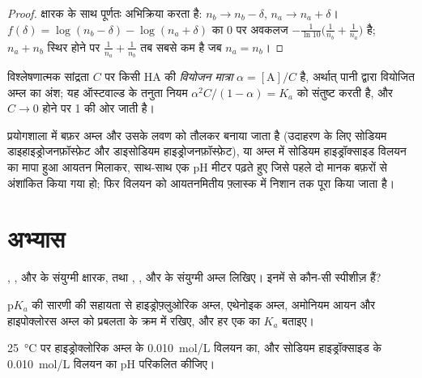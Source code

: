 \begin{proof}
 क्षारक के साथ पूर्णतः अभिक्रिया करता है: $n_b \to n_b - \delta$,
$n_a \to n_a + \delta$। $f(\delta) = \log(n_b - \delta) -
\log(n_a + \delta)$ का 0 पर अवकलज $-\frac{1}{\ln10}\big(\frac{1}{n_b} +
\frac{1}{n_a}\big)$ है; $n_a + n_b$ स्थिर होने पर $\frac1{n_a} + \frac1{n_b}$
तब सबसे कम है जब $n_a = n_b$।
\end{proof}

\begin{definition}[वियोजन मात्रा]\label{def:b1:predominant-reaction:dissociation}
विश्लेषणात्मक सांद्रता $C$ पर किसी  HA की \emph{वियोजन
मात्रा} $\alpha = [\mathrm{A}]/C$ है, अर्थात्
पानी द्वारा वियोजित अम्ल का अंश; यह ऑस्टवाल्ड के तनुता
नियम $\alpha^2C/(1 - \alpha) = K_a$ को संतुष्ट करती है, और $C \to 0$ होने पर 1 की ओर जाती है।
\end{definition}

\begin{inthelab}[बफ़र बनाना]
प्रयोगशाला में बफ़र अम्ल और उसके लवण को तौलकर बनाया जाता है
(उदाहरण के लिए सोडियम डाइहाइड्रोजनफ़ॉस्फ़ेट और डाइसोडियम
हाइड्रोजनफ़ॉस्फ़ेट), या अम्ल में सोडियम हाइड्रॉक्साइड विलयन का मापा हुआ आयतन
मिलाकर, साथ-साथ एक pH मीटर पढ़ते हुए जिसे पहले दो
मानक बफ़रों से अंशांकित किया गया हो; फिर विलयन को आयतनमितीय फ़्लास्क में
निशान तक पूरा किया जाता है।
\end{inthelab}

\section{अभ्यास}

\begin{exercise}[$\star$]\label{exo:b1:predominant-reaction:1}
, ,  और
 के संयुग्मी क्षारक, तथा , ,  और
 के संयुग्मी अम्ल लिखिए। इनमें से कौन-सी स्पीशीज़  हैं?
\end{exercise}

\begin{exercise}[$\star$]\label{exo:b1:predominant-reaction:2}
$\mathrm{p}K_a$ की सारणी की सहायता से हाइड्रोफ़्लुओरिक अम्ल, एथेनोइक अम्ल,
अमोनियम आयन और हाइपोक्लोरस अम्ल को प्रबलता के क्रम में रखिए, और हर एक का $K_a$
बताइए।
\end{exercise}

\begin{exercise}[$\star$]\label{exo:b1:predominant-reaction:3}
\qty{25}{\celsius} पर हाइड्रोक्लोरिक अम्ल के \qty{0.010}{mol/L} विलयन का,
और सोडियम हाइड्रॉक्साइड के \qty{0.010}{mol/L} विलयन का pH परिकलित कीजिए।
\end{exercise}


